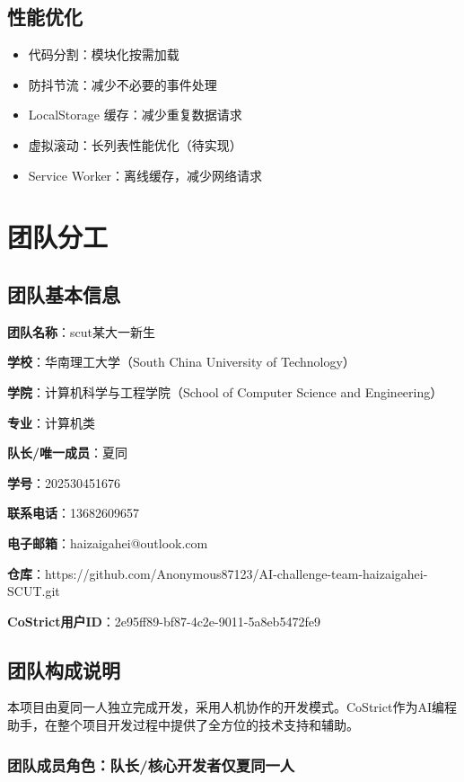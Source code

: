 \documentclass[12pt,a4paper]{article}
\begin{document}
\subsection{性能优化}

\begin{itemize}
    \item 代码分割：模块化按需加载
    \item 防抖节流：减少不必要的事件处理
    \item LocalStorage 缓存：减少重复数据请求
    \item 虚拟滚动：长列表性能优化（待实现）
    \item Service Worker：离线缓存，减少网络请求
\end{itemize}

\section{团队分工}

\subsection{团队基本信息}

\textbf{团队名称}：scut某大一新生

\textbf{学校}：华南理工大学（South China University of Technology）

\textbf{学院}：计算机科学与工程学院（School of Computer Science and Engineering）

\textbf{专业}：计算机类

\textbf{队长/唯一成员}：夏同

\textbf{学号}：202530451676

\textbf{联系电话}：13682609657

\textbf{电子邮箱}：haizaigahei@outlook.com

\textbf{仓库}：https://github.com/Anonymous87123/AI-challenge-team-haizaigahei-SCUT.git

\textbf{CoStrict用户ID}：2e95ff89-bf87-4c2e-9011-5a8eb5472fe9

\subsection{团队构成说明}

本项目由夏同一人独立完成开发，采用人机协作的开发模式。CoStrict作为AI编程助手，在整个项目开发过程中提供了全方位的技术支持和辅助。

\subsubsection{团队成员角色：队长/核心开发者仅夏同一人}
\end{document}
